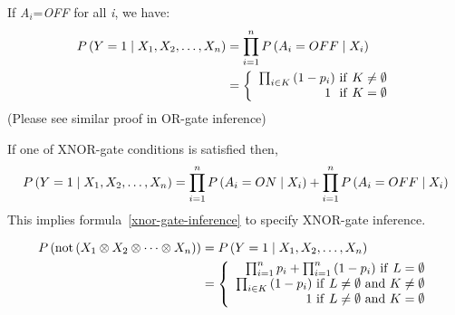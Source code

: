 \documentclass{article}
\numberwithin{equation}{section}
\numberwithin{figure}{section}
\numberwithin{table}{section}
\begin{document}
If \textit{A${}_{i}$}=\textit{OFF} for all \textit{i}, we have:
\begin{align*}
P\left(Y=1\mathrel{\left|\vphantom{Y=1 X_1,X_2,\dots ,X_n}\right.\kern-\nulldelimiterspace}X_1,X_2,\dots ,X_n\right)&=\prod^n_{i=1}{P\left(A_i=OFF\mathrel{\left|\vphantom{A_i=OFF X_i}\right.\kern-\nulldelimiterspace}X_i\right)}\\
&=\left\{ \begin{array}{r}
\prod_{i\in K}{\left(1-p_i\right)}\ \mathrm{if}\ K\neq \emptyset  \\ 
1\ \ \mathrm{if}\ K=\emptyset  \end{array}
\right.
\end{align*}
(Please see similar proof in OR-gate inference)

If one of XNOR-gate conditions is satisfied then,
\[P\left(Y=1\mathrel{\left|\vphantom{Y=1 X_1,X_2,\dots ,X_n}\right.\kern-\nulldelimiterspace}X_1,X_2,\dots ,X_n\right)=\prod^n_{i=1}{P\left(A_i=ON\mathrel{\left|\vphantom{A_i=ON X_i}\right.\kern-\nulldelimiterspace}X_i\right)}+\prod^n_{i=1}{P\left(A_i=OFF\mathrel{\left|\vphantom{A_i=OFF X_i}\right.\kern-\nulldelimiterspace}X_i\right)}\] 
This implies formula~\ref{xnor-gate-inference} to specify XNOR-gate inference.

\begin{equation}
\begin{split}
P\left(\mathrm{not}\left(X_1\otimes X_2\otimes \dots \otimes X_n\right)\right)&=P\left(Y=1\mathrel{\left|\vphantom{Y=1 X_1,X_2,\dots ,X_n}\right.\kern-\nulldelimiterspace}X_1,X_2,\dots ,X_n\right)\\
&=\left\{ \begin{array}{r}
\prod^n_{i=1}{p_i}+\prod^n_{i=1}{\left(1-p_i\right)}\ \mathrm{if\ }L=\emptyset  \\ 
\prod_{i\in K}{\left(1-p_i\right)}\ \mathrm{if}\ L\neq \emptyset \ \mathrm{and}\ K\neq \emptyset  \\ 
1\ \mathrm{if}\ L\neq \emptyset \ \mathrm{and}\ K=\emptyset  \end{array}
\right.
\end{split}
\label{xnor-gate-inference}
\end{equation}
\end{document}
